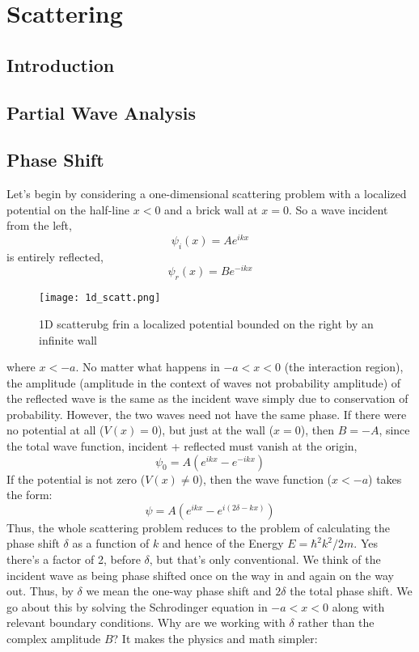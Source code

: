 \chapter{Scattering}
\section{Introduction}
\section{Partial Wave Analysis}

\section{Phase Shift}
Let's begin by considering a one-dimensional scattering problem with a localized potential on the half-line $x < 0$ and a brick wall at $x = 0$. So a wave incident from the left,
\begin{equation}
\psi_{i}(x) = A e^{ikx}
\end{equation}
is entirely reflected,
\begin{equation}
\psi_{r}(x) = B e^{-ikx}
\end{equation}
\begin{figure}[h]
	\centering
	\texttt{[image: 1d\_scatt.png]}
	\caption{1D scatterubg frin a localized potential bounded on the right by an infinite wall}
\end{figure}
where $x < -a$. No matter what happens in $-a < x < 0$ (the interaction region), the amplitude (amplitude in the context of waves not probability amplitude) of the reflected wave is the same as the incident wave simply due to conservation of probability. However, the two waves need not have the same phase. If there were no potential at all ($V(x) = 0$), but just at the wall ($x = 0$), then $B = -A$, since the total wave function, incident + reflected must vanish at the origin,
\begin{equation}
\psi_{0} = A (e^{ikx} - e^{-ikx})
\end{equation}
If the potential is not zero ($V(x) \neq 0$), then the wave function ($x < -a$) takes the form:
\begin{equation}
\psi = A \left(e^{ikx} - e^{i(2 \delta - kx)} \right)
\end{equation}
Thus, the whole scattering problem reduces to the problem of calculating the phase shift $\delta$ as a function of $k$ and hence of the Energy $E = \hbar^{2}k^{2}/2m$. Yes there's a factor of 2, before $\delta$, but that's only conventional. We think of the incident wave as being phase shifted once on the way in and again on the way out. Thus, by $\delta$ we mean the one-way phase shift and $2\delta$ the total phase shift. We go about this by solving the Schrodinger equation in $-a < x < 0$ along with relevant boundary conditions. Why are we working with $\delta$ rather than the complex amplitude $B$? It makes the physics and math simpler:
